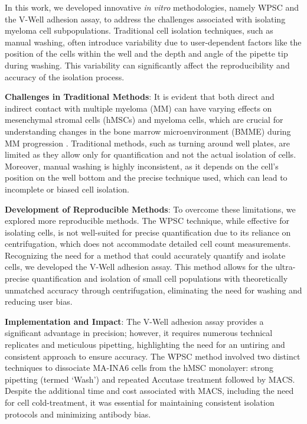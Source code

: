 



%
\label{sec:discussion_novel_methods}%
In this work, we developed innovative \textit{in vitro} methodologies, namely
\acf{WPSC} and the V-Well adhesion assay, to address
the challenges associated with isolating myeloma cell subpopulations.
Traditional cell isolation techniques, such as manual washing, often introduce
variability due to user-dependent factors like the position of the cells within
the well and the depth and angle of the pipette tip during washing. This
variability can significantly affect the reproducibility and accuracy of the
isolation process.

\textbf{Challenges in Traditional Methods}: It is evident that both direct and
indirect contact with multiple myeloma (MM) can have varying effects on
mesenchymal stromal cells (hMSCs) and myeloma cells, which are crucial for
understanding changes in the bone marrow microenvironment (BMME) during MM
progression \cite{fairfieldMultipleMyelomaCells2020,
dziadowiczBoneMarrowStromaInduced2022}. Traditional methods, such as turning
around well plates, are limited as they allow only for quantification and not
the actual isolation of cells. Moreover, manual washing is highly inconsistent,
as it depends on the cell’s position on the well bottom and the precise
technique used, which can lead to incomplete or biased cell isolation.

\textbf{Development of Reproducible Methods}: To overcome these limitations, we
explored more reproducible methods. The WPSC technique, while effective for
isolating cells, is not well-suited for precise quantification due to its
reliance on centrifugation, which does not accommodate detailed cell count
measurements. Recognizing the need for a method that could accurately quantify
and isolate cells, we developed the V-Well adhesion assay. This method allows
for the ultra-precise quantification and isolation of small cell populations
with  theoretically unmatched accuracy
through centrifugation, eliminating the need for washing and reducing user bias.

\textbf{Implementation and Impact}: The V-Well adhesion assay provides a
significant advantage in precision; however, it requires numerous technical
replicates and meticulous pipetting, highlighting the need for an untiring and
consistent approach to ensure accuracy. The WPSC method involved two distinct
techniques to dissociate MA-INA6 cells from the hMSC monolayer: strong pipetting
(termed `Wash') and repeated Accutase treatment followed by \acf{MACS}. Despite the additional time and cost associated with MACS,
including the need for cell cold-treatment, it was essential for maintaining
consistent isolation protocols and minimizing antibody bias.

